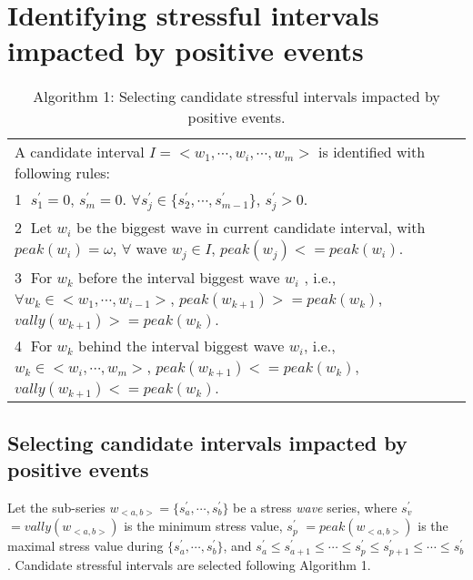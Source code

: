 \appendix
\section{Identifying stressful intervals impacted by positive events}
\begin{table*}
\begin{center}
\caption{\small{Algorithm 1: Selecting candidate stressful intervals impacted by positive events.}}
\begin{tabular}{l} \hline
A candidate interval $I = <w_1,\cdots, w_i,\cdots, w_m>$ is identified with following rules:\\
\textcircled{1} $s^{'}_1 = 0$, $s^{'}_m = 0$. $\forall s^{'}_j \in \{s^{'}_2,\cdots,s^{'}_{m-1}\}$, $s^{'}_j > 0$.\\
\textcircled{2} Let $w_i$ be the biggest wave in current candidate interval, with $peak(w_i) = \omega$, $\forall $ wave $w_j \in I$, $peak(w_j)<=peak(w_i)$.\\
\textcircled{3} For $w_k$ before the interval biggest wave $w_i$ , i.e., $\forall w_k \in <w_1,\cdots,w_{i-1}>$, $peak(w_{k+1})>=peak(w_k)$, $vally(w_{k+1}) >= peak(w_k)$.\\
\textcircled{4} For $w_k$ behind the interval biggest wave $w_i$, i.e.,  $w_k \in <w_{i}, \cdots, w_m>$, $peak(w_{k+1})<=peak(w_k)$, $vally(w_{k+1}) <= peak(w_k)$.\\\hline
\end{tabular}
\end{center}
\end{table*}

\subsection{Selecting candidate intervals impacted by positive events}
\label{alg:alg1}
Let the sub-series $w_{<a,b>} = \{s^{'}_a, \cdots, s^{'}_b\}$ be a stress \emph{wave} series,
where $s^{'}_v$ $= {vally(w_{<a,b>})}$ is the minimum stress value,
$s^{'}_p$ $= peak(w_{<a,b>})$ is the maximal stress value during $\{s^{'}_a,\cdots,s^{'}_b\}$,
and $s^{'}_a \leq s^{'}_{a+1} \leq \cdots \leq s^{'}_p \leq s^{'}_{p+1} \leq \cdots \leq s^{'}_b$. 
Candidate stressful intervals are selected following Algorithm 1. 

